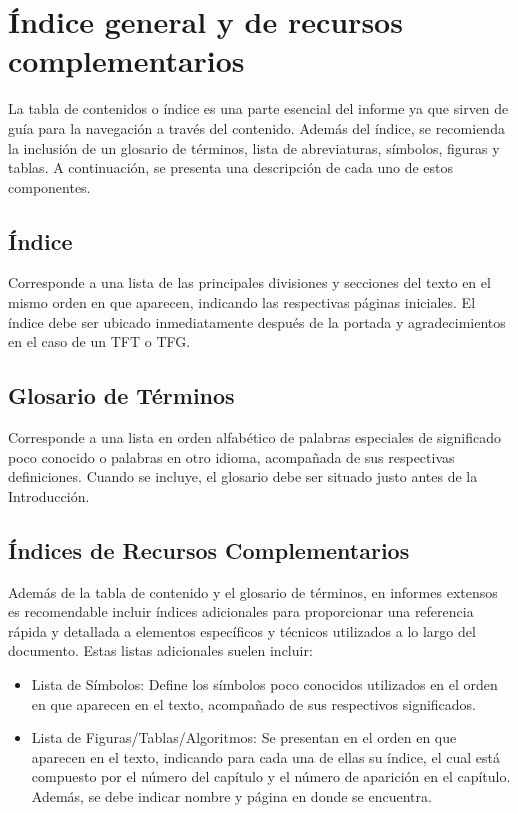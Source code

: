 \chapter{Índice general y de recursos complementarios}
La tabla de contenidos o índice es una parte esencial del informe ya que sirven de guía para la navegación a través del contenido. Además del índice, se recomienda la inclusión de un glosario de términos, lista de abreviaturas, símbolos, figuras y tablas. A continuación, se presenta una descripción de cada uno de estos componentes.

\section{Índice}
Corresponde a una lista de las principales divisiones y secciones del texto en el mismo orden en que aparecen, indicando las respectivas páginas iniciales. El índice debe ser ubicado inmediatamente después de la portada y agradecimientos en el caso de un TFT o TFG. 

\section{Glosario de Términos}
Corresponde a una lista en orden alfabético de palabras especiales de significado poco conocido o palabras en otro idioma, acompañada de sus respectivas definiciones. Cuando se incluye, el glosario debe ser situado justo antes de la Introducción.

\section{Índices de Recursos Complementarios}
Además de la tabla de contenido y el glosario de términos, en informes extensos es recomendable incluir índices adicionales para proporcionar una referencia rápida y detallada a elementos específicos y técnicos utilizados a lo largo del documento. Estas listas adicionales suelen incluir:
\begin{itemize}
    \item Lista de Símbolos: Define los símbolos poco conocidos utilizados en el orden en que aparecen en el texto, acompañado de sus respectivos significados.
    \item Lista de Figuras/Tablas/Algoritmos: Se presentan en el orden en que aparecen en el texto, indicando para cada una de ellas su índice, el cual está compuesto por el número del capítulo y el número de aparición en el capítulo. Además, se debe indicar nombre y página en donde se encuentra.
\end{itemize}